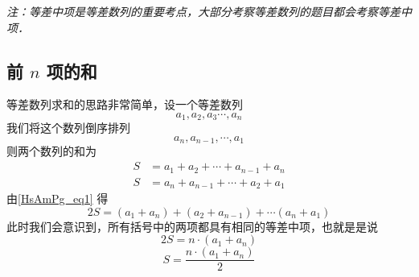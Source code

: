\textsl{注：等差中项是等差数列的重要考点，大部分考察等差数列的题目都会考察等差中项．}

\subsection{前 $n$ 项的和}
等差数列求和的思路非常简单，设一个等差数列
\begin{equation}
a_1,a_2,a_3\cdots,a_n
\end{equation}
我们将这个数列倒序排列
\begin{equation}
a_n,a_{n-1},\cdots,a_1
\end{equation}
则两个数列的和为
\begin{equation}\label{HsAmPg_eq1}
\begin{aligned}
S &= a_1 + a_2 + \cdots + a_{n-1} + a_n \\
S &= a_n + a_{n - 1} + \cdots + a_2 + a_1
\end{aligned}
\end{equation}
由\autoref{HsAmPg_eq1} 得
\begin{equation}
2S = (a_1+a_n) + (a_2+a_{n-1}) +\cdots (a_n + a_1)
\end{equation}
此时我们会意识到，所有括号中的两项都具有相同的等差中项，也就是是说
\begin{equation}
2S = n \cdot (a_1+a_n)
\end{equation}
\begin{equation}
S = \frac{n\cdot(a_1+a_n)}{2}
\end{equation}